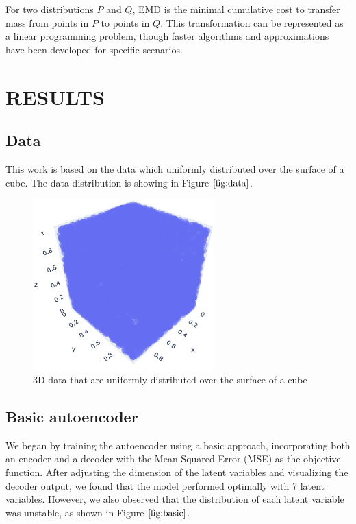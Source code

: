 \documentclass{article}
\begin{document}
For two distributions 
$P$ and 
$Q$, EMD is the minimal cumulative cost to transfer mass from points in 
$P$ to points in 
$Q$. This transformation can be represented as a linear programming problem, though faster algorithms and approximations have been developed for specific scenarios.


\section{RESULTS}
\label{sec:results}

\subsection{Data}
\label{ssec:data}

This work is based on the data which uniformly distributed over the surface of a cube. 
The data distribution is showing in Figure $\ref{fig:data}$.

\begin{figure}[htb]
  \begin{minipage}[b]{1.0\linewidth}
    \centering
    \centerline{\includegraphics[width=7.0cm]{images/data}}
  \end{minipage}
  \caption{3D data that are uniformly distributed over the surface of a cube}
  \label{fig:data}
  \end{figure}

\subsection{Basic autoencoder}
\label{ssec:basicautoencoder}

We began by training the autoencoder using a basic approach, incorporating both an encoder and a decoder with the Mean Squared Error (MSE) as the objective function. After adjusting the dimension of the latent variables and visualizing the decoder output, we found that the model performed optimally with 7 latent variables. However, we also observed that the distribution of each latent variable was unstable, as shown in Figure $\ref{fig:basic}$.
\end{document}
